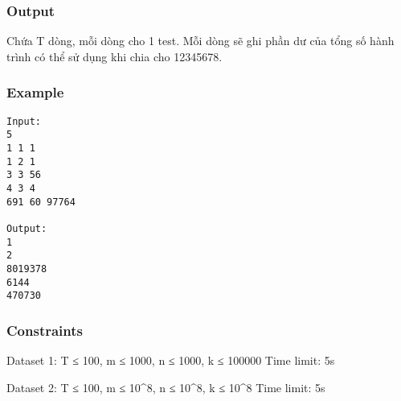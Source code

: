 \subsubsection{   Output  }

   Chứa T dòng, mỗi dòng cho 1 test. Mỗi dòng sẽ ghi phần dư của tổng số hành trình có thể sử dụng khi chia cho 12345678.  

\subsubsection{   Example  }
\begin{verbatim}
Input:
5
1 1 1
1 2 1
3 3 56
4 3 4
691 60 97764

Output:
1
2
8019378
6144
470730 
\end{verbatim}

\subsubsection{   Constraints  }

   Dataset 1: T ≤ 100, m ≤ 1000, n ≤ 1000, k ≤ 100000 Time limit: 5s  

   Dataset 2: T ≤ 100, m ≤ 10^8, n ≤ 10^8, k ≤ 10^8 Time limit: 5s  
